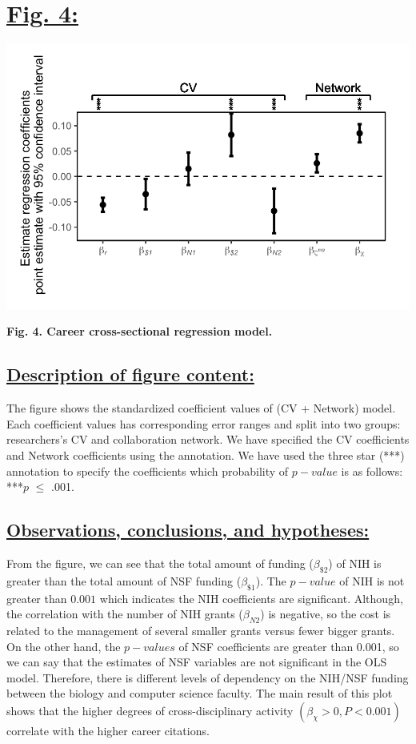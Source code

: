 \documentclass{article}\usepackage[]{graphicx}\usepackage[]{color}
\begin{document}
\section*{\underline{Fig. 4:}}
\begin{center}
\includegraphics[scale=0.88]{Fig4.png}
\newline
\par{\textbf{Fig. 4. Career cross-sectional regression model.}}
\end{center}
\subsection*{\underline{Description of figure content:}}
\par{
The figure shows the standardized coefficient values of (CV + Network) model. Each coefficient values has corresponding error ranges and split into two groups: researchers's CV and collaboration network. We have specified the CV coefficients and Network coefficients using the annotation. We have used the three star (***) annotation to specify the coefficients which probability of $p-value$ is as follows: ***$\textit{p}$ $\leq$ .001.
}
\subsection*{\underline{Observations, conclusions, and hypotheses:}}
\par{
From the figure, we can see that the total amount of funding ($\beta_{\$2}$) of NIH is greater than the total amount of NSF funding ($\beta_{\$1}$). The $p-value$ of NIH is not greater than $0.001$ which indicates the NIH coefficients are significant. Although, the correlation with the number of NIH grants ($\beta_{N2}$) is negative, so the cost is related to the management of several smaller grants versus fewer bigger grants. On the other hand, the $p-values$ of NSF coefficients are greater than 0.001, so we can say that the estimates of NSF variables are not significant in the OLS model. Therefore, there is different levels of dependency on the NIH/NSF funding between the biology and computer science faculty. The main result of this plot shows that the higher degrees of cross-disciplinary activity $(\beta_{\chi} > 0, P < 0.001)$ correlate with the higher career citations.
}
\end{document}
